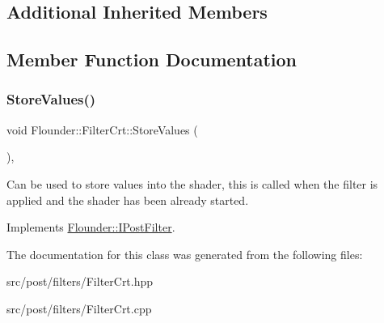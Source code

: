 \subsection*{Additional Inherited Members}


\subsection{Member Function Documentation}
\mbox{\label{class_flounder_1_1_filter_crt_a79cb3ff1010f5292f0548c0d10ba1772}} 
\subsubsection{\texorpdfstring{Store\+Values()}{StoreValues()}}
{\footnotesize\ttfamily void Flounder\+::\+Filter\+Crt\+::\+Store\+Values (\begin{DoxyParamCaption}{ }\end{DoxyParamCaption})\hspace{0.3cm}{\ttfamily [override]}, {\ttfamily [virtual]}}



Can be used to store values into the shader, this is called when the filter is applied and the shader has been already started. 



Implements \hyperlink{class_flounder_1_1_i_post_filter_a20420ec0a9bac67437740552bea9ab74}{Flounder\+::\+I\+Post\+Filter}.



The documentation for this class was generated from the following files\+:\begin{DoxyCompactItemize}
\item 
src/post/filters/Filter\+Crt.\+hpp\item 
src/post/filters/Filter\+Crt.\+cpp\end{DoxyCompactItemize}

